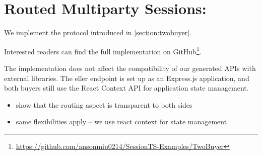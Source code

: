 \section{Routed Multiparty Sessions: }
\label{section:evaltwobuyer}

We implement the  protocol
introduced in \cref{section:twobuyer}. 


Interested readers can find the full implementation on
GitHub\footnote{\url{https://github.com/ansonmiu0214/SessionTS-Examples/TwoBuyer}}.

The \newtheory implementation does not affect
the compatibility of our generated APIs with external libraries.
The eller endpoint is set up as an Express.js
application, and both buyers still use the React Context API
for application state management.

\begin{itemize}
\item show that the routing aspect is transparent to both sides
\item same flexibilities apply -- we use react context for state management
\end{itemize}
